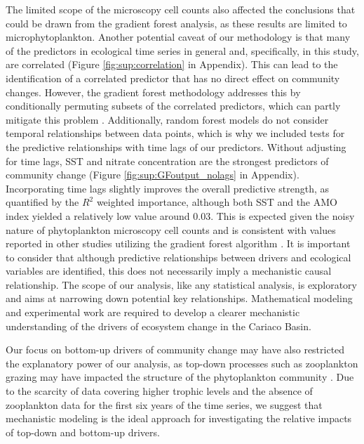 \documentclass[draft]{agujournal2019}
\begin{document}
    
    The limited scope of the microscopy cell counts also affected the conclusions that could be drawn from the gradient forest analysis, as these results are limited to microphytoplankton. 
    Another potential caveat of our methodology is that many of the predictors in ecological time series in general and, specifically, in this study, are correlated (Figure \ref{fig:sup:correlation} in Appendix). This can lead to the identification of a correlated predictor that has no direct effect on community changes. However, the gradient forest methodology addresses this by conditionally permuting subsets of the correlated predictors, which can partly mitigate this problem \cite{ellis_gradient_2012}. Additionally, random forest models do not consider temporal relationships between data points, which is why we included tests for the predictive relationships with time lags of our predictors. Without adjusting for time lags, SST and nitrate concentration are the strongest predictors of community change (Figure \ref{fig:sup:GFoutput_nolags} in Appendix). Incorporating time lags slightly improves the overall predictive strength, as quantified by the $R^2$ weighted importance, although both SST and the AMO index yielded a relatively low value around \qty{0.03}{}. This is expected given the noisy nature of phytoplankton microscopy cell counts and is consistent with values reported in other studies utilizing the gradient forest algorithm \cite{pitcher_example_2012, roland_pitcher_exploring_2012, roubeix_identification_2016, samhouri_defining_2017, fraker_temporal_2022}. It is important to consider that although predictive relationships between drivers and ecological variables are identified, this does not necessarily imply a mechanistic causal relationship. The scope of our analysis, like any statistical analysis, is exploratory and aims at narrowing down potential key relationships. Mathematical modeling and experimental work are required to develop a clearer mechanistic understanding of the drivers of ecosystem change in the Cariaco Basin.
     
    Our focus on bottom-up drivers of community change may have also restricted the explanatory power of our analysis, as top-down processes such as zooplankton grazing may have impacted the structure of the phytoplankton community \cite{frank_ups_2007, banas_adding_2011, acevedo-trejos_mechanisms_2015}. Due to the scarcity of data covering higher trophic levels and the absence of zooplankton data for the first six years of the time series, we suggest that mechanistic modeling is the ideal approach for investigating the relative impacts of top-down and bottom-up drivers.
    
\end{document}

